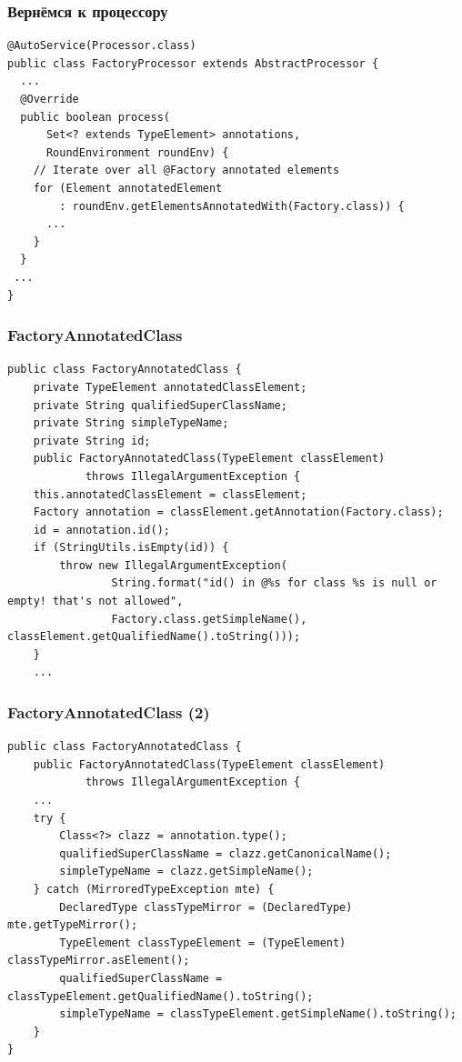 \documentclass[xetex,mathserif,serif]{beamer}
\begin{document}
	\begin{frame}[fragile]
		\frametitle{Вернёмся к процессору}
		\begin{verbatim}
@AutoService(Processor.class)
public class FactoryProcessor extends AbstractProcessor {
  ...
  @Override
  public boolean process(
      Set<? extends TypeElement> annotations, 
      RoundEnvironment roundEnv) {
    // Iterate over all @Factory annotated elements
    for (Element annotatedElement 
        : roundEnv.getElementsAnnotatedWith(Factory.class)) {
      ...
    }
  }
 ...
}
		\end{verbatim}
	\end{frame}

	\begin{frame}[fragile]
		\frametitle{FactoryAnnotatedClass}
		\begin{footnotesize}
			\begin{verbatim}
public class FactoryAnnotatedClass {
    private TypeElement annotatedClassElement; 
    private String qualifiedSuperClassName;
    private String simpleTypeName; 
    private String id;
    public FactoryAnnotatedClass(TypeElement classElement) 
            throws IllegalArgumentException {
    this.annotatedClassElement = classElement;
    Factory annotation = classElement.getAnnotation(Factory.class);
    id = annotation.id(); 
    if (StringUtils.isEmpty(id)) {
        throw new IllegalArgumentException(
                String.format("id() in @%s for class %s is null or empty! that's not allowed",
                Factory.class.getSimpleName(), classElement.getQualifiedName().toString()));
    }
    ...
			\end{verbatim}
		\end{footnotesize}
	\end{frame}

	\begin{frame}[fragile]
		\frametitle{FactoryAnnotatedClass (2)}
		\begin{footnotesize}
			\begin{verbatim}
public class FactoryAnnotatedClass {
    public FactoryAnnotatedClass(TypeElement classElement) 
            throws IllegalArgumentException {
    ...
    try {
        Class<?> clazz = annotation.type();
        qualifiedSuperClassName = clazz.getCanonicalName();
        simpleTypeName = clazz.getSimpleName();
    } catch (MirroredTypeException mte) {
        DeclaredType classTypeMirror = (DeclaredType) mte.getTypeMirror();
        TypeElement classTypeElement = (TypeElement) classTypeMirror.asElement();
        qualifiedSuperClassName = classTypeElement.getQualifiedName().toString();
        simpleTypeName = classTypeElement.getSimpleName().toString();
    }
}
			\end{verbatim}
		\end{footnotesize}
	\end{frame}
\end{document}
